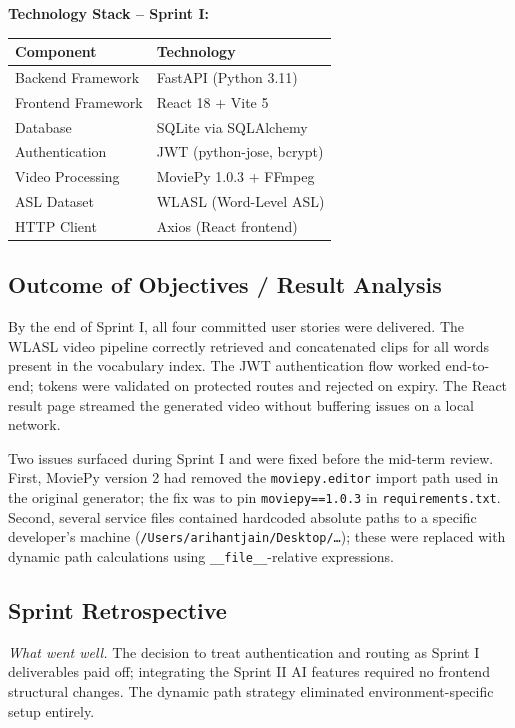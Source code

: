 \documentclass[12pt,a4paper,oneside]{report}
\begin{document}
\textbf{Technology Stack -- Sprint I:}

\begin{center}
\small
\begin{tabular}{ll}
\toprule
\textbf{Component} & \textbf{Technology} \\
\midrule
Backend Framework & FastAPI (Python 3.11) \\
Frontend Framework & React 18 + Vite 5 \\
Database & SQLite via SQLAlchemy \\
Authentication & JWT (python-jose, bcrypt) \\
Video Processing & MoviePy 1.0.3 + FFmpeg \\
ASL Dataset & WLASL (Word-Level ASL) \\
HTTP Client & Axios (React frontend) \\
\bottomrule
\end{tabular}
\end{center}

\subsection{Outcome of Objectives / Result Analysis}

By the end of Sprint I, all four committed user stories were delivered. The WLASL video pipeline correctly retrieved and concatenated clips for all words present in the vocabulary index. The JWT authentication flow worked end-to-end; tokens were validated on protected routes and rejected on expiry. The React result page streamed the generated video without buffering issues on a local network.

Two issues surfaced during Sprint I and were fixed before the mid-term review. First, MoviePy version 2 had removed the \texttt{moviepy.editor} import path used in the original generator; the fix was to pin \texttt{moviepy==1.0.3} in \texttt{requirements.txt}. Second, several service files contained hardcoded absolute paths to a specific developer's machine (\texttt{/Users/arihantjain/Desktop/\ldots}); these were replaced with dynamic path calculations using \texttt{\_\_file\_\_}-relative expressions.

\subsection{Sprint Retrospective}

\textit{What went well.} The decision to treat authentication and routing as Sprint I deliverables paid off; integrating the Sprint II AI features required no frontend structural changes. The dynamic path strategy eliminated environment-specific setup entirely.
\end{document}
